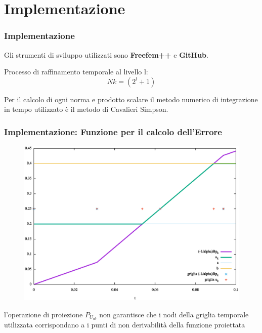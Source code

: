 \documentclass{beamer}
\theoremstyle{definition}
\theoremstyle{remark}
\theoremstyle{plain}
\theoremstyle{definition}
\begin{document}
\section{Implementazione}
\begin{frame}
\frametitle{Implementazione}
Gli strumenti di sviluppo utilizzati sono \textbf{Freefem++} e \textbf{GitHub}.

Processo di raffinamento temporale al livello l: 
\begin{equation}
Nk = ( 2^l + 1 )
\label{Nk}
\end{equation}

Per il calcolo di ogni norma e prodotto scalare il metodo numerico di integrazione in tempo utilizzato è il metodo di Cavalieri Simpson.

\end{frame}
\frametitle{Implementazione: Funzione per il calcolo dell'Errore}
\begin{frame}
\begin{figure}
\centering
\includegraphics[scale=0.25]{img/cap5/griglie}
\label{fig:griglie}
\end{figure}

l'operazione di proiezione $P_{U_{ab}}$ non garantisce che i nodi della griglia temporale utilizzata corrispondano a i punti di non derivabilità della funzione proiettata

\end{frame}
\end{document}
